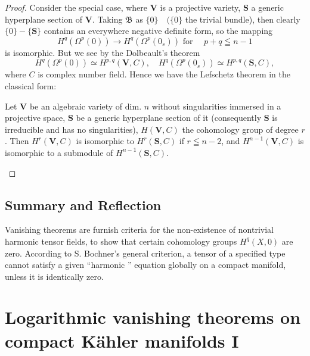 \documentclass[lang=en,12pt]{beautybook}
\begin{document}
\begin{proof}
  Consider the special case, where $\boldsymbol{V}$ is a projective variety, $\boldsymbol{S}$ a generic hyperplane section of $\boldsymbol{V}$. Taking $\mathfrak{B}$ as $\{0\} \quad(\{0\}$ the trivial bundle), then clearly $\{0\}-\{\boldsymbol{S}\}$ contains an everywhere negative definite form, so the mapping
  \begin{equation*}
  H^q\left(\Omega^p(0)\right) \rightarrow H^q\left(\Omega^p\left(0_s\right)\right) \text { for } \quad p+q \leqq n-1
  \end{equation*}
  is isomorphic. But we see by the Dolbeault's theorem
  \begin{equation*}
  H^q\left(\Omega^p(0)\right) \simeq H^{p, q}(\boldsymbol{V}, C), \quad H^q\left(\Omega^p\left(0_s\right)\right) \simeq H^{p, q}(\boldsymbol{S}, C),
  \end{equation*}
  where $C$ is complex number field. Hence we have the Lefschetz theorem in the classical form:
  \begin{theorem}
    Let $\boldsymbol{V}$ be an algebraic variety of dim. $n$ without singularities immersed in a projective space, $\boldsymbol{S}$ be a generic hyperplane section of it (consequently $\boldsymbol{S}$ is irreducible and has no singularities), $H(\boldsymbol{V}, C)$ the cohomology group of degree $r$.
  Then $H^r(\boldsymbol{V}, C)$ is isomorphic to $H^r(\boldsymbol{S}, C)$ if $r \leqq n-2$, and $H^{n-1}(\boldsymbol{V}, C)$ is isomorphic to a submodule of $H^{n-1}(\boldsymbol{S}, C)$.
  \end{theorem}
\end{proof}

\section{Summary and Reflection}

Vanishing theorems are furnish criteria for the non-existence of nontrivial harmonic tensor fields, to show that certain cohomology groups $H^q(X, 0)$ are zero.
According to S. Bochner's general criterion, a tensor of a specified type cannot satisfy a given ``harmonic '' equation globally on a compact manifold, unless it is identically zero. 







\chapter{Logarithmic vanishing theorems on compact K\"ahler manifolds I }
\end{document}
